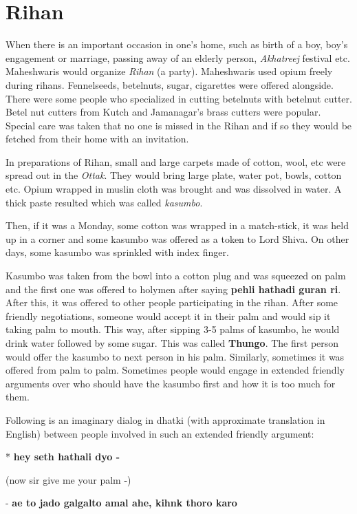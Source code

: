 \chapter{Rihan}
When there is an important occasion in one's home, such as birth of a boy, boy's
engagement or marriage, passing away of an elderly person, \textit{Akhatreej}
festival etc. Maheshwaris would organize \textit{Rihan} (a party). Maheshwaris
used opium freely during rihans. Fennelseeds, betelnuts, sugar, cigarettes were
offered alongside. There were some people who specialized in cutting betelnuts with
betelnut cutter. Betel nut cutters from Kutch and Jamanagar's brass cutters
were popular. Special care was taken that no one is missed in the Rihan and if
so they would be fetched from their home with an invitation.

In preparations of Rihan, small and large carpets made of cotton, wool, etc
were spread out in the \textit{Ottak}. They would bring large plate, water pot, bowls,
cotton etc. Opium wrapped in muslin cloth was brought and was dissolved in
water. A thick paste resulted which was called \textit{kasumbo}.

Then, if it was a Monday, some cotton was wrapped in a match-stick, it
was held up in a corner and some kasumbo was offered as a token to Lord Shiva.
On other days, some kasumbo was sprinkled with index finger.

Kasumbo was taken from the bowl into a cotton plug and was squeezed on palm and
the first one was offered to holymen after saying \textbf{pehli hathadi guran
ri}. After this, it was offered to other people participating in the rihan.
After some friendly negotiations, someone would accept it in their palm and
would sip it taking palm to mouth. This way, after sipping 3-5 palms of
kasumbo, he would drink water followed by some sugar. This was called
\textbf{Thungo}. The first person would offer the kasumbo to next person in his
palm. Similarly, sometimes it was offered from palm to palm. Sometimes people
would engage in extended friendly arguments over who should have the kasumbo
first and how it is too much for them.

Following is an imaginary dialog in dhatki (with approximate translation in
English) between people involved in such an extended friendly argument:

* \textbf{hey seth hathali dyo -}

(now sir give me your palm -)

- \textbf{ae to jado galgalto amal ahe, kihnk thoro karo}

